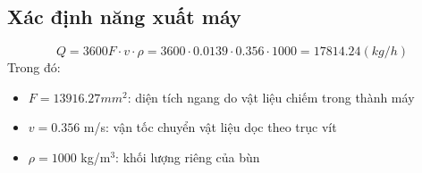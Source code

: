 \subsection{Xác định năng xuất máy}
\[
    Q = 3600F\cdot v\cdot \rho = 3600\cdot 0.0139\cdot 0.356\cdot 1000 = 17814.24 (kg/h)
\]
Trong đó:
\begin{itemize}
    \item $F = 13916.27 mm^2$: diện tích ngang do vật liệu chiếm trong thành máy
    \item $v = 0.356$ m/s: vận tốc chuyển vật liệu dọc theo trục vít
    \item $\rho = 1000$ kg/m$^3$: khối lượng riêng của bùn
\end{itemize}

